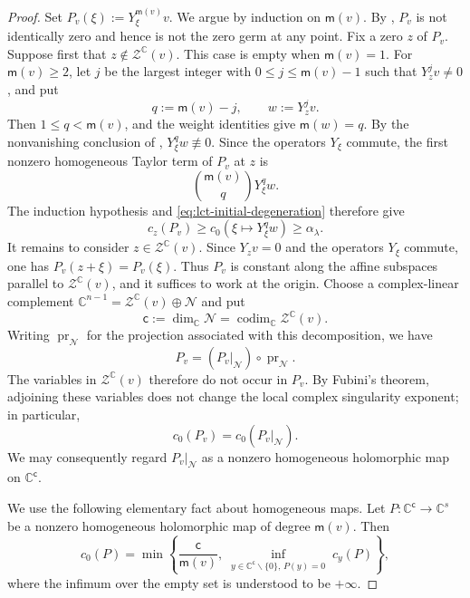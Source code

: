 \documentclass[reqno,11pt]{amsart}
\numberwithin{equation}{section}
\theoremstyle{definition}
\theoremstyle{remark}
\begin{document}
\begin{proof}
Set $P_v(\xi):=Y_\xi^{\mathsf m(v)} v$. We argue by induction on $\mathsf m(v)$. By
, $P_v$ is not identically zero and hence is
not the zero germ at any point. Fix a
zero $z$ of $P_v$.
Suppose first that $z\notin\mathcal Z^{\mathbb C}(v)$. This case is empty
when $\mathsf m(v)=1$. For $\mathsf m(v) \ge2$, let $j$ be the largest integer with
$0\le j\le \mathsf m(v)-1$ such that $Y_z^jv\ne0$, and put
$$
q:=\mathsf m(v)-j,
\qquad w:=Y_z^jv.
$$
Then $1\le q<\mathsf m(v)$, and the weight identities give
$\mathsf m(w)=q$. By the nonvanishing conclusion of
, $Y_\xi^qw\not\equiv0$. Since the operators
$Y_\xi$ commute, the first nonzero homogeneous Taylor
term of $P_v$ at $z$ is
$$
\binom {\mathsf m(v)} q Y_\xi^qw.
$$
The induction hypothesis and \eqref{eq:lct-initial-degeneration} therefore
give
$$
c_z(P_v)\ge c_0(\xi\mapsto Y_\xi^qw)\ge\alpha_{\lambda}.
$$
It remains to consider $z\in\mathcal Z^{\mathbb C}(v)$. Since
$Y_zv=0$ and the operators $Y_\xi$ commute, one has
$
P_v(z+\xi)=P_v(\xi)$.
Thus $P_v$ is constant along the affine subspaces parallel to
$\mathcal Z^{\mathbb C}(v)$, and it suffices to work at the origin. Choose a complex-linear complement $\mathbb C^{n-1}
=
\mathcal Z^{\mathbb C}(v)\oplus\mathcal N$ and put
$$
\mathsf{c}:=\dim_{\mathbb C}\mathcal N
=
\operatorname{codim}_{\mathbb C}\mathcal Z^{\mathbb C}(v).
$$
Writing $\operatorname{pr}_{\mathcal N}$ for the projection associated with
this decomposition, we have
$$
P_v
=
(P_v|_{\mathcal N})\circ\operatorname{pr}_{\mathcal N}.
$$
The variables in $\mathcal Z^{\mathbb C}(v)$ therefore do not occur in
$P_v$. By Fubini's theorem, adjoining these variables does not
change the local complex singularity exponent; in particular,
$$
c_0(P_v)=c_0(P_v|_{\mathcal N}).
$$
We may consequently regard $P_v|_{\mathcal N}$ as a nonzero homogeneous
holomorphic map on $\mathbb C^{\mathsf{c}}$.

We use the following elementary fact about homogeneous maps. Let
$P:\mathbb C^{\mathsf{c}}\to\mathbb C^s$ be a nonzero homogeneous holomorphic map of
degree $\mathsf m(v)$. Then
\begin{equation}\label{eq:lct-homogeneous-map}
c_0(P)
=
\min\left\{
\frac {\mathsf{c}}{\mathsf m(v)},
\inf_{\substack{y\in\mathbb C^{\mathsf{c}}\smallsetminus\{0\},\, P(y)=0}}
c_y(P)
\right\},
\end{equation}
where the infimum over the empty set is understood to be $+\infty$.


\end{proof}
\end{document}
